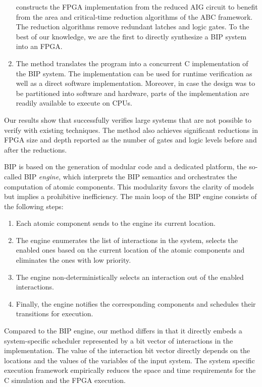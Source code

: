 \begin{enumerate}
  \biptool{} constructs the FPGA implementation from the reduced AIG circuit 
  to benefit from the area and critical-time reduction algorithms 
  of the ABC framework. 
  The reduction algorithms remove redundant latches and logic gates.  
  To the best of our knowledge, we are the first to directly synthesize a BIP system into an FPGA. 

\item 
    The method translates the \caig program into a concurrent C 
    implementation of the BIP system.
    The implementation can be used for runtime verification as well as a direct
    software implementation. 
    Moreover, in case the design was to be partitioned into software and hardware, 
    parts of the implementation are readily available to execute on CPUs. 
  
\end{enumerate}
%

Our results show that \biptool{} successfully verifies large systems that are not possible to verify with existing techniques. 
The method also achieves significant reductions in FPGA size and depth reported as the 
number of gates and logic levels before and after the reductions.

BIP is based on the generation of modular code and a dedicated platform, the so-called BIP \emph{engine}, which interprets the BIP semantics and orchestrates the computation of atomic components. This modularity favors the clarity of models but implies a prohibitive inefficiency. The main loop of the BIP engine consists of the following steps:
%
\begin{enumerate}
\item Each atomic component sends to the engine its current location.
\item The engine enumerates the list of interactions in the system, 
  selects the enabled ones based on the current location of the atomic 
  components and eliminates the ones with low priority.
\item The engine non-deterministically selects an interaction out of the enabled interactions.
\item Finally, the engine notifies the corresponding components and schedules their transitions for execution. 
\end{enumerate}
%
Compared to the BIP engine, our method differs in that it directly embeds a system-specific scheduler represented by a bit vector of interactions in the implementation.
The value of the  interaction bit vector directly depends on the locations and the values of the variables of the input system. 
The system specific execution framework empirically reduces the space and time requirements for the C simulation and the FPGA execution. 

